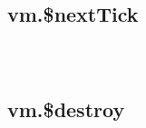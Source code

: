 \subsection{vm.\$nextTick}








\begin{lstlisting}[language=JavaScript]

\end{lstlisting}




\begin{lstlisting}[language=JavaScript]

\end{lstlisting}




\begin{lstlisting}[language=JavaScript]

\end{lstlisting}




\subsection{vm.\$destroy}








\begin{lstlisting}[language=JavaScript]

\end{lstlisting}




\begin{lstlisting}[language=JavaScript]

\end{lstlisting}




\begin{lstlisting}[language=JavaScript]

\end{lstlisting}














\begin{lstlisting}[language=JavaScript]

\end{lstlisting}




